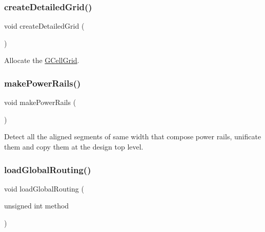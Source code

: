 \subsubsection{\texorpdfstring{create\+Detailed\+Grid()}{createDetailedGrid()}}
{\footnotesize\ttfamily void create\+Detailed\+Grid (\begin{DoxyParamCaption}{ }\end{DoxyParamCaption})\hspace{0.3cm}{\ttfamily [virtual]}}

Allocate the \hyperlink{classKatabatic_1_1GCellGrid}{G\+Cell\+Grid}. \mbox{\label{classKatabatic_1_1KatabaticEngine_aaba3b9450c85634131146fb507089f2d}} 
\subsubsection{\texorpdfstring{make\+Power\+Rails()}{makePowerRails()}}
{\footnotesize\ttfamily void make\+Power\+Rails (\begin{DoxyParamCaption}{ }\end{DoxyParamCaption})}

Detect all the aligned segments of same width that compose power rails, unificate them and copy them at the design top level. \mbox{\label{classKatabatic_1_1KatabaticEngine_a583925cfe4bbadcc1c24fe619debce09}} 
\subsubsection{\texorpdfstring{load\+Global\+Routing()}{loadGlobalRouting()}}
{\footnotesize\ttfamily void load\+Global\+Routing (\begin{DoxyParamCaption}\item[{unsigned int}]{method }\end{DoxyParamCaption})\hspace{0.3cm}{\ttfamily [virtual]}}


